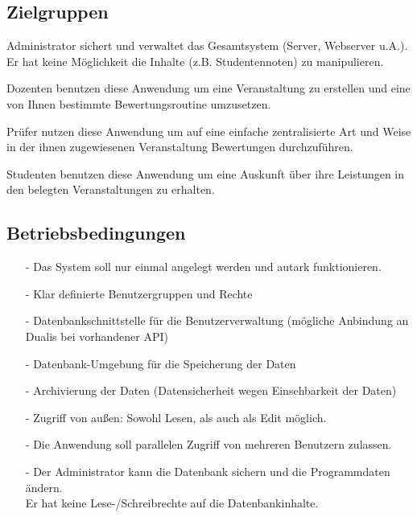 		
		\subsection{Zielgruppen}
		
		\begin{description}
		\item[Administrator] 	 Administrator sichert und verwaltet das Gesamtsystem (Server, Webserver u.A.). Er hat keine Möglichkeit die Inhalte (z.B. Studentennoten) zu manipulieren. 
		\item[Dozent]	Dozenten benutzen diese Anwendung um eine Veranstaltung zu erstellen und eine von Ihnen bestimmte Bewertungsroutine umzusetzen.
		\item[Prüfer] Prüfer nutzen diese Anwendung um auf eine einfache zentralisierte Art und Weise in der ihnen zugewiesenen Veranstaltung Bewertungen durchzuführen.
		\item[Studenten]	Studenten benutzen diese Anwendung um eine Auskunft über ihre Leistungen in den belegten Veranstaltungen zu erhalten.
		\end{description}

		\subsection{Betriebsbedingungen}
		\begin{itemize}
		\item[-]	Das System soll nur einmal angelegt werden und autark funktionieren.
		\item[-]	Klar definierte Benutzergruppen und Rechte
		\item[-]	Datenbankschnittstelle für die Benutzerverwaltung (mögliche Anbindung an Dualis bei vorhandener API)
		\item[-]	Datenbank-Umgebung für die Speicherung der Daten
		\item[-]	Archivierung der Daten (Datensicherheit wegen Einsehbarkeit der Daten)
		\item[-]	Zugriff von außen: Sowohl Lesen, als auch als Edit möglich. 
		\item[-]	Die Anwendung soll parallelen Zugriff von mehreren Benutzern zulassen.
		\item[-]	Der Administrator kann die Datenbank sichern und die Programmdaten ändern.\\
					Er hat keine Lese-/Schreibrechte auf die Datenbankinhalte.
		\end{itemize}

